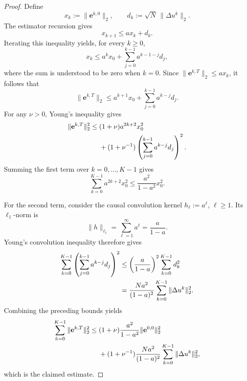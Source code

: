 \documentclass[10pt,a4paper]{amsart}
\begin{document}
\begin{proof}
Define
\begin{equation}
x_k:=\|\mathbf e^{k,0}\|_2,
\qquad
d_k:=\sqrt N\,\|\Delta u^k\|_2 .
\end{equation}
The estimator recursion gives
\begin{equation}
x_{k+1}\le a x_k+d_k .
\end{equation}
Iterating this inequality yields, for every \(k\ge 0\),
\begin{equation}
x_k
\le
a^k x_0
+
\sum_{j=0}^{k-1}a^{k-1-j}d_j,
\end{equation}
where the sum is understood to be zero when \(k=0\). Since \(\|\mathbf e^{k,T}\|_2\le a x_k\), it follows that
\begin{equation}
\|\mathbf e^{k,T}\|_2
\le
a^{k+1}x_0
+
\sum_{j=0}^{k-1}a^{k-j}d_j .
\end{equation}
For any \(\nu>0\), Young's inequality gives
\begin{align}
\|\mathbf e^{k,T}\|_2^2
\le{}&
(1+\nu)a^{2k+2}x_0^2 \notag\\
&+
(1+\nu^{-1})
\left(
\sum_{j=0}^{k-1}a^{k-j}d_j
\right)^2 .
\end{align}
Summing the first term over \(k=0,\dots,K-1\) gives
\begin{equation}
\sum_{k=0}^{K-1}a^{2k+2}x_0^2
\le
\frac{a^2}{1-a^2}x_0^2 .
\end{equation}

For the second term, consider the causal convolution kernel \(h_\ell:=a^\ell\), \(\ell\ge1\). Its \(\ell_1\)-norm is
\begin{equation}
\|h\|_{\ell_1}
=
\sum_{\ell=1}^{\infty}a^\ell
=
\frac{a}{1-a}.
\end{equation}
Young's convolution inequality therefore gives
\begin{align}
\sum_{k=0}^{K-1}
\left(
\sum_{j=0}^{k-1}a^{k-j}d_j
\right)^2
&\le
\left(\frac{a}{1-a}\right)^2
\sum_{k=0}^{K-1}d_k^2 \notag\\
&=
\frac{Na^2}{(1-a)^2}
\sum_{k=0}^{K-1}\|\Delta u^k\|_2^2 .
\end{align}
Combining the preceding bounds yields
\begin{align}
\sum_{k=0}^{K-1}\|\mathbf e^{k,T}\|_2^2
\le{}&
(1+\nu)\frac{a^2}{1-a^2}
\|\mathbf e^{0,0}\|_2^2 \notag\\
&+
(1+\nu^{-1})
\frac{Na^2}{(1-a)^2}
\sum_{k=0}^{K-1}\|\Delta u^k\|_2^2,
\end{align}
which is the claimed estimate.
\end{proof}
\end{document}
